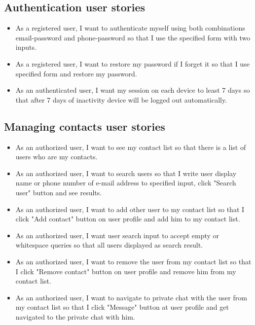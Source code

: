 \subsection{Authentication user stories}\label{subsec:authentication-user-stories}
\begin{itemize}
    \item As a registered user, I want to authenticate myself using both combinations email-password and phone-password
    so that I use the specified form with two inputs.
    \item As a registered user, I want to restore my password if I forget it so that I use specified form and restore my password.
    \item As an authenticated user, I want my session on each device to least 7 days so that after 7 days of inactivity device
    will be logged out automatically.
\end{itemize}

\subsection{Managing contacts user stories}\label{subsec:adding-contacts}
\begin{itemize}
    \item As an authorized user, I want to see my contact list so that there is a list of users who are my contacts.
    \item As an authorized user, I want to search users so that I write user display name or phone number of e-mail
    address to specified input, click "Search user" button and see results.
    \item As an authorized user, I want to add other user to my contact list so that I click "Add contact" button on
    user profile and add him to my contact list.
    \item As an authorized user, I want user search input to accept empty or whitespace queries so that all users
    displayed as search result.
    \item As an authorized user, I want to remove the user from my contact list so that I click "Remove contact" button
    on user profile and remove him from my contact list.
    \item As an authorized user, I want to navigate to private chat with the user from my contact list so that I click
    "Message" button at user profile and get navigated to the private chat with him.
\end{itemize}

